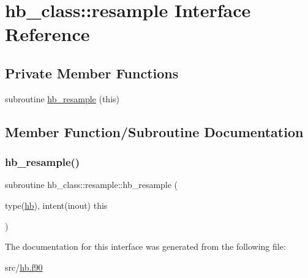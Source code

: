 \hypertarget{interfacehb__class_1_1resample}{}\section{hb\+\_\+class\+:\+:resample Interface Reference}
\label{interfacehb__class_1_1resample}
\subsection*{Private Member Functions}
\begin{DoxyCompactItemize}
\item 
subroutine \hyperlink{interfacehb__class_1_1resample_a0e81bb1a6021146b562a77d66f2fc179}{hb\+\_\+resample} (this)
\end{DoxyCompactItemize}


\subsection{Member Function/\+Subroutine Documentation}
\mbox{\label{interfacehb__class_1_1resample_a0e81bb1a6021146b562a77d66f2fc179}} 
\subsubsection{\texorpdfstring{hb\+\_\+resample()}{hb\_resample()}}
{\footnotesize\ttfamily subroutine hb\+\_\+class\+::resample\+::hb\+\_\+resample (\begin{DoxyParamCaption}\item[{type(\hyperlink{structhb__class_1_1hb}{hb}), intent(inout)}]{this }\end{DoxyParamCaption})\hspace{0.3cm}{\ttfamily [private]}}



The documentation for this interface was generated from the following file\+:\begin{DoxyCompactItemize}
\item 
src/\hyperlink{hb_8f90}{hb.\+f90}\end{DoxyCompactItemize}
